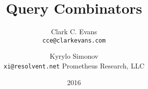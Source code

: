 \documentclass[9pt,twocolumn,article]{memoir}
\newcommand{\email}[1]{\normalsize{\texttt{#1}}}
\begin{document}
\title{Query Combinators}
\author{
    Clark C. Evans \\ \email{cce@clarkevans.com} \and
    Kyrylo Simonov \\ \email{xi@resolvent.net} \andnext
    Prometheus Research, LLC}
\date{2016}

\maketitle











\end{document}
